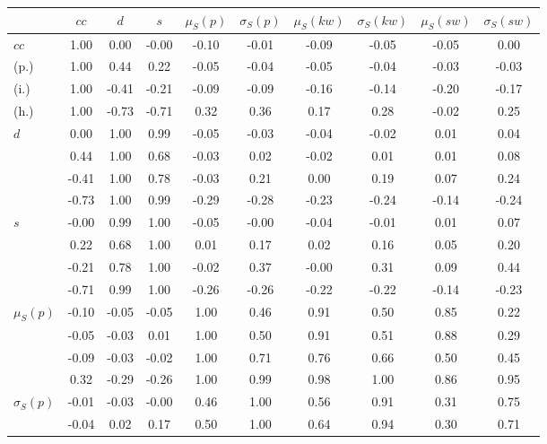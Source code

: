 \begin{table*}[h!]
\begin{center}
\begin{tabular}{| l | c | c | c | c | c | c | c | c | c |}\hline
 & $cc$ & $d$ & $s$ & $\mu_S(p)$ & $\sigma_S(p)$ & $\mu_S(kw)$ & $\sigma_S(kw)$ & $\mu_S(sw)$ & $\sigma_S(sw)$ \\\hline
$cc$ & 1.00  & 0.00  & -0.00  & -0.10  & -0.01  & -0.09  & -0.05  & -0.05  & 0.00 \\\hline
(p.) & 1.00  & 0.44  & 0.22  & -0.05  & -0.04  & -0.05  & -0.04  & -0.03  & -0.03 \\\hline
(i.) & 1.00  & -0.41  & -0.21  & -0.09  & -0.09  & -0.16  & -0.14  & -0.20  & -0.17 \\\hline
(h.) & 1.00  & -0.73  & -0.71  & 0.32  & 0.36  & 0.17  & 0.28  & -0.02  & 0.25 \\\hline
$d$ & 0.00  & 1.00  & 0.99  & -0.05  & -0.03  & -0.04  & -0.02  & 0.01  & 0.04 \\\hline
 & 0.44  & 1.00  & 0.68  & -0.03  & 0.02  & -0.02  & 0.01  & 0.01  & 0.08 \\\hline
 & -0.41  & 1.00  & 0.78  & -0.03  & 0.21  & 0.00  & 0.19  & 0.07  & 0.24 \\\hline
 & -0.73  & 1.00  & 0.99  & -0.29  & -0.28  & -0.23  & -0.24  & -0.14  & -0.24 \\\hline
$s$ & -0.00  & 0.99  & 1.00  & -0.05  & -0.00  & -0.04  & -0.01  & 0.01  & 0.07 \\\hline
 & 0.22  & 0.68  & 1.00  & 0.01  & 0.17  & 0.02  & 0.16  & 0.05  & 0.20 \\\hline
 & -0.21  & 0.78  & 1.00  & -0.02  & 0.37  & -0.00  & 0.31  & 0.09  & 0.44 \\\hline
 & -0.71  & 0.99  & 1.00  & -0.26  & -0.26  & -0.22  & -0.22  & -0.14  & -0.23 \\\hline
$\mu_S(p)$ & -0.10  & -0.05  & -0.05  & 1.00  & 0.46  & 0.91  & 0.50  & 0.85  & 0.22 \\\hline
 & -0.05  & -0.03  & 0.01  & 1.00  & 0.50  & 0.91  & 0.51  & 0.88  & 0.29 \\\hline
 & -0.09  & -0.03  & -0.02  & 1.00  & 0.71  & 0.76  & 0.66  & 0.50  & 0.45 \\\hline
 & 0.32  & -0.29  & -0.26  & 1.00  & 0.99  & 0.98  & 1.00  & 0.86  & 0.95 \\\hline
$\sigma_S(p)$ & -0.01  & -0.03  & -0.00  & 0.46  & 1.00  & 0.56  & 0.91  & 0.31  & 0.75 \\\hline
 & -0.04  & 0.02  & 0.17  & 0.50  & 1.00  & 0.64  & 0.94  & 0.30  & 0.71 \\\hline

\end{tabular}
\end{center}
\end{table*}
